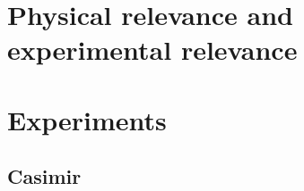 \begin{itemize}


\section{Physical relevance and experimental relevance}

\section{Experiments}
\subsection{Casimir}


\end{itemize}
